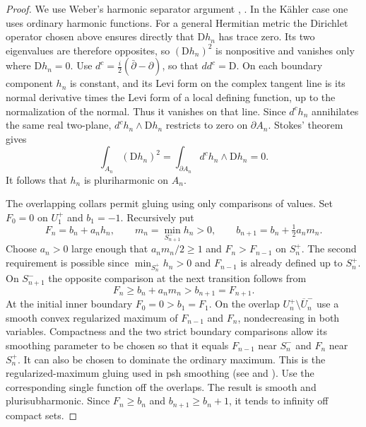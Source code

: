 \documentclass[11pt]{amsart}
\theoremstyle{remark}
\numberwithin{equation}{section}
\newcommand{\D}{\mathrm{D}}
\begin{document}
\begin{proof}
We use Weber's harmonic separator argument
\cite[Propositions~1.1 and 3.2]{WeberEarly},
\cite[Lemma~1.1 and its proof]{Weber}. In the K\"ahler case one uses
ordinary harmonic functions. For a general Hermitian metric the
Dirichlet operator chosen above ensures directly that $\D h_n$
has trace zero. Its two eigenvalues are therefore
opposites, so $(\D h_n)^2$ is nonpositive and vanishes only where
$\D h_n=0$. Use $d^c=\frac{i}{2}(\bar\partial-\partial)$, so that
$dd^c=\D$. On each boundary component $h_n$ is constant, and its Levi
form on the complex tangent line is its normal derivative times the
Levi form of a local defining function, up to the normalization of the
normal. Thus it vanishes on that line. Since $d^ch_n$ annihilates the
same real two-plane, $d^ch_n\wedge\D h_n$ restricts to zero on
$\partial A_n$. Stokes' theorem gives
\[
 \int_{A_n}(\D h_n)^2=\int_{\partial A_n}d^ch_n\wedge\D h_n=0.
\]
It follows that $h_n$ is pluriharmonic on $A_n$.

The overlapping collars permit gluing using only comparisons of values.
Set $F_0=0$ on $U_1^+$ and $b_1=-1$. Recursively put
\[
 F_n=b_n+a_n h_n,\qquad
 m_n=\min_{S_{n+1}^-}h_n>0,\qquad
 b_{n+1}=b_n+\tfrac12 a_n m_n.
\]
Choose $a_n>0$ large enough that $a_nm_n/2\geq1$ and
$F_n>F_{n-1}$ on $S_n^+$. The second requirement is possible since
$\min_{S_n^+}h_n>0$ and $F_{n-1}$ is already defined up to $S_n^+$.
On $S_{n+1}^-$ the opposite comparison at the next transition follows
from
\[
 F_n\geq b_n+a_nm_n>b_{n+1}=F_{n+1}.
\]
At the initial inner boundary $F_0=0>b_1=F_1$. On the overlap
$U_n^+\setminus\overline U_n^-$ use a smooth convex regularized
maximum of $F_{n-1}$ and $F_n$, nondecreasing in both variables.
Compactness and the two strict boundary comparisons allow its smoothing
parameter to be chosen so that it equals $F_{n-1}$ near $S_n^-$ and
$F_n$ near $S_n^+$. It can also be chosen to dominate the ordinary
maximum. This is the regularized-maximum gluing used in psh smoothing
(see \cite{Richberg} and \cite[\S1]{BK}). Use the corresponding single function off the overlaps. The
result is smooth and plurisubharmonic. Since $F_n\geq b_n$ and
$b_{n+1}\geq b_n+1$, it tends to infinity off compact sets.
\end{proof}
\end{document}
